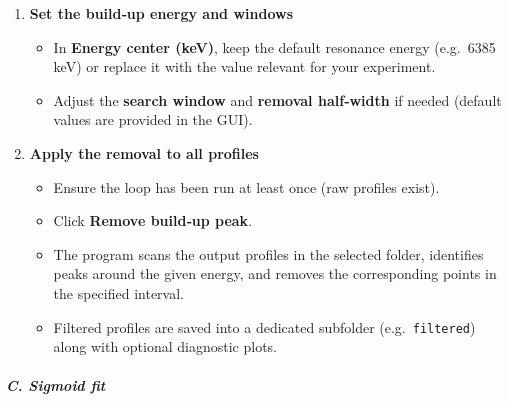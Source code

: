 \begin{enumerate}
\def\labelenumi{\arabic{enumi}.}
\tightlist
\item
  \textbf{Set the build‑up energy and windows}

  \begin{itemize}
  \tightlist
  \item
    In \textbf{Energy center (keV)}, keep the default resonance energy
    (e.g.~6385 keV) or replace it with the value relevant for your
    experiment.\\
  \item
    Adjust the \textbf{search window} and \textbf{removal half‑width} if
    needed (default values are provided in the GUI).
  \end{itemize}
\item
  \textbf{Apply the removal to all profiles}

  \begin{itemize}
  \tightlist
  \item
    Ensure the loop has been run at least once (raw profiles exist).\\
  \item
    Click \textbf{Remove build‑up peak}.\\
  \item
    The program scans the output profiles in the selected folder,
    identifies peaks around the given energy, and removes the
    corresponding points in the specified interval.\\
  \item
    Filtered profiles are saved into a dedicated subfolder
    (e.g.~\texttt{filtered}) along with optional diagnostic plots.
  \end{itemize}
\end{enumerate}

\hypertarget{c.-sigmoid-fit}{%
\subparagraph{C. Sigmoid fit}\label{c.-sigmoid-fit}}

